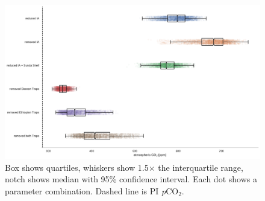 \documentclass[11pt,letterpaper]{article}
\newcommand{\pCOtwo}{\textit{p}CO$_{2}$\xspace}
\begin{document}
\begin{figure}
    \centering
    \includegraphics[width=1\textwidth]{Manuscript/Figures/scenario_pCO2.pdf}
    \caption{Box shows quartiles, whiskers show 1.5$\times$ the interquartile range, notch shows median with 95\% confidence interval. Each dot shows a parameter combination. Dashed line is PI \pCOtwo.}
    \label{fig:scenario_pCO2}
\end{figure}

\clearpage
\newpage
\footnotesize

\singlespacing



\end{document}
